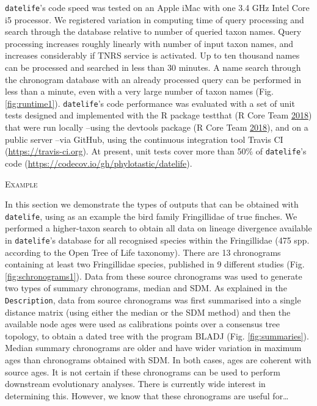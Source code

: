 \documentclass[]{article}
\begin{document}
\texttt{datelife}'s code speed was tested on an Apple iMac
with one 3.4 GHz Intel Core i5 processor.
We registered variation in computing time of query processing and search through the database relative to number of queried taxon names.
Query processing increases roughly linearly with number of input taxon names, and
increases considerably if TNRS service is activated. Up to ten thousand names can be processed and searched in less than 30 minutes. A name search through the chronogram database with an already processed query can be performed in less than a minute, even with a very large number of taxon names (Fig. \ref{fig:runtime1}).
\texttt{datelife}'s code performance was evaluated with a set of unit tests designed and
implemented with the R package testthat (R Core Team \protect\hyperlink{ref-RCoreTeam2018}{2018}) that were run locally
--using the devtools package (R Core Team \protect\hyperlink{ref-RCoreTeam2018}{2018}), and on a public server --via
GitHub, using the continuous integration tool Travis CI (\url{https://travis-ci.org}). At
present, unit tests cover more than 50\% of \texttt{datelife}'s code (\url{https://codecov.io/gh/phylotastic/datelife}).

\begin{center}
\textsc{Example}
\end{center}

In this section we demonstrate the types of outputs that can be obtained with \texttt{datelife}, using as an example the bird family Fringillidae of true finches. We performed a higher-taxon search to obtain all data on lineage divergence available in \texttt{datelife}'s database for all recognised species within the Fringillidae (475 spp. according to the Open Tree of Life taxonomy). There are 13 chronograms containing at least two Fringillidae species, published in 9 different studies (Fig. \ref{fig:schronograms1}).
Data from these source chronograms was used to generate two types of summary chronograms, median and SDM. As explained in the \texttt{Description}, data from source chronograms was first summarised into a single distance matrix (using either the median or the SDM method) and then the available node ages were used as calibrations points over a consensus tree topology, to obtain a dated tree with the program BLADJ (Fig. \ref{fig:summaries}). Median summary chronograms are older and have wider variation in maximum ages than chronograms obtained with SDM. In both cases, ages are coherent with source ages.
It is not certain if these chronograms can be used to perform downstream evolutionary analyses. There is currently wide interest in determining this. However, we know that these chronograms are useful for\ldots{}
\end{document}

